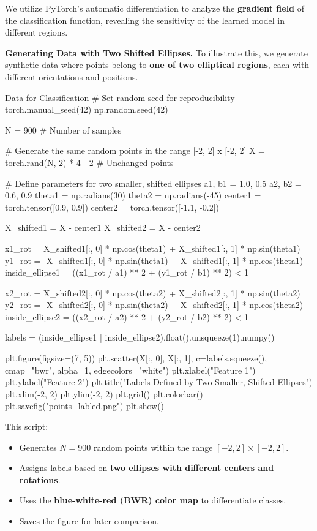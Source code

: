 We utilize PyTorch's automatic differentiation to analyze the \textbf{gradient field} of the classification function, revealing the sensitivity of the learned model in different regions.

{\bf Generating Data with Two Shifted Ellipses.} To illustrate this, we generate synthetic data where points belong to \textbf{one of two elliptical regions}, each with different orientations and positions.

\begin{codeonly}{Data for Classification}
# Set random seed for reproducibility
torch.manual_seed(42)
np.random.seed(42)

N = 900  # Number of samples

# Generate the same random points in the range [-2, 2] x [-2, 2]
X = torch.rand(N, 2) * 4 - 2  # Unchanged points

# Define parameters for two smaller, shifted ellipses
a1, b1 = 1.0, 0.5
a2, b2 = 0.6, 0.9
theta1 = np.radians(30)
theta2 = np.radians(-45)
center1 = torch.tensor([0.9, 0.9])
center2 = torch.tensor([-1.1, -0.2])

X_shifted1 = X - center1
X_shifted2 = X - center2

x1_rot = X_shifted1[:, 0] * np.cos(theta1) + X_shifted1[:, 1] * np.sin(theta1)
y1_rot = -X_shifted1[:, 0] * np.sin(theta1) + X_shifted1[:, 1] * np.cos(theta1)
inside_ellipse1 = ((x1_rot / a1) ** 2 + (y1_rot / b1) ** 2) < 1

x2_rot = X_shifted2[:, 0] * np.cos(theta2) + X_shifted2[:, 1] * np.sin(theta2)
y2_rot = -X_shifted2[:, 0] * np.sin(theta2) + X_shifted2[:, 1] * np.cos(theta2)
inside_ellipse2 = ((x2_rot / a2) ** 2 + (y2_rot / b2) ** 2) < 1

labels = (inside_ellipse1 | inside_ellipse2).float().unsqueeze(1).numpy()

plt.figure(figsize=(7, 5))
plt.scatter(X[:, 0], X[:, 1], c=labels.squeeze(), cmap="bwr", alpha=1, edgecolors="white")
plt.xlabel("Feature 1")
plt.ylabel("Feature 2")
plt.title("Labels Defined by Two Smaller, Shifted Ellipses")
plt.xlim(-2, 2)
plt.ylim(-2, 2)
plt.grid()
plt.colorbar()
plt.savefig("points_labled.png")
plt.show()
\end{codeonly}

This script:
\begin{itemize}
    \item Generates $N=900$ random points within the range $[-2,2] \times [-2,2]$.
    \item Assigns labels based on \textbf{two ellipses with different centers and rotations}.
    \item Uses the \textbf{blue-white-red (BWR) color map} to differentiate classes.
    \item Saves the figure for later comparison.
\end{itemize}

